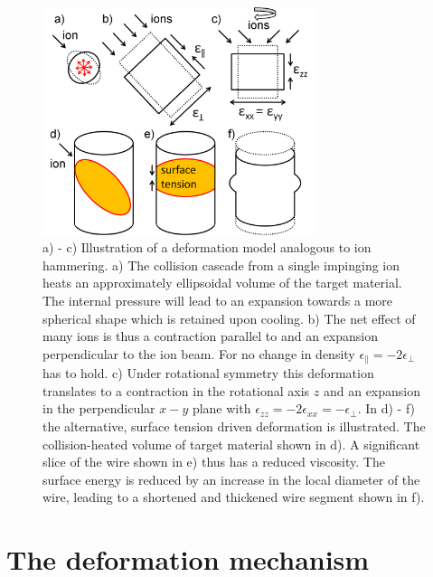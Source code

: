 \begin{figure}[thbp]
	\centering
		\includegraphics[width=8cm]{images/deformationmodel.jpg}
	\caption{a) - c) Illustration of a deformation model analogous to ion hammering. a) The collision cascade from a single impinging ion heats an approximately ellipsoidal volume of the target material. The internal pressure will lead to an expansion towards a more spherical shape which is retained upon cooling. b) The net effect of many ions is thus a contraction parallel to and an expansion perpendicular to the ion beam. For no change in density $\epsilon_\parallel = -2\epsilon_\perp$ has to hold. c) Under rotational symmetry this deformation translates to a contraction in the rotational axis $z$ and an expansion in the perpendicular $x-y$ plane with $\epsilon_{zz} = -2\epsilon_{xx} = -\epsilon_\perp$. In d) - f) the alternative, surface tension driven deformation is illustrated. The collision-heated volume of target material shown in d). A significant slice of the wire shown in e) thus has a reduced viscosity. The surface energy is reduced by an increase in the local diameter of the wire, leading to a shortened and thickened wire segment shown in f).} 
	\label{deformationmodel}
\end{figure}

\section{The deformation mechanism}

